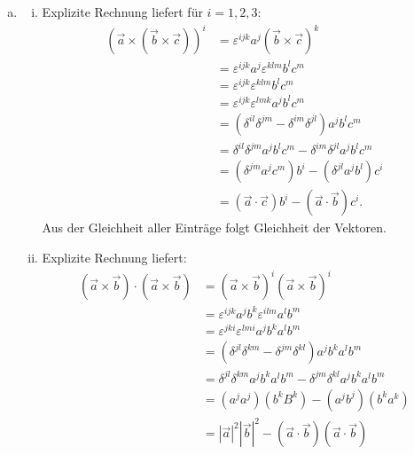 \documentclass{theozettel}
\renewcommand{\epsilon}{\varepsilon}
\begin{document}
\begin{enumerate}[(a)]
	\item 	\begin{enumerate}[(i)]
				\item 	Explizite Rechnung liefert für $i =  1,2,3$:
						\begin{align*}
							(\vec{a} \times (\vec{b} \times \vec{c}))^{i} &= \epsilon^{ijk}a^{j} (\vec{b} \times \vec{c})^{k} \\
							&= \epsilon^{ijk}a^{j}\epsilon^{klm} b^{l}c^{m} \\
							&= \epsilon^{ijk}\epsilon^{klm} b^{l}c^{m} \\
							&= \epsilon^{ijk}\epsilon^{lmk} a^{j}b^{l}c^{m} \\
							&= (\delta^{il}\delta^{jm} - \delta^{im}\delta^{jl}) a^{j}b^{l}c^{m} \\
							&= \delta^{il}\delta^{jm}a^{j}b^{l}c^{m} - \delta^{im}\delta^{jl}a^{j}b^{l}c^{m} \\
							&= (\delta^{jm}a^{j}c^{m})b^{i} - (\delta^{jl}a^{j}b^{l})c^{i} \\
							&= (\vec{a} \cdot \vec{c})b^{i} - (\vec{a} \cdot \vec{b})c^{i}.
						\end{align*}
						Aus der Gleichheit aller Einträge folgt Gleichheit der Vektoren.
						
				\item 	Explizite Rechnung liefert:
						\begin{align*}
							(\vec{a} \times \vec{b})\cdot (\vec{a} \times \vec{b}) &= (\vec{a} \times \vec{b})^{i}(\vec{a} \times \vec{b})^{i} \\
							&= \epsilon^{ijk}a^{j}b^{k} \epsilon^{ilm}a^{l}b^{m} \\
							&= \epsilon^{jki}\epsilon^{lmi} a^{j}b^{k} a^{l}b^{m} \\
							&= (\delta^{jl}\delta^{km} - \delta^{jm}\delta^{kl})a^{j}b^{k}a^{l}b^{m} \\
							&= \delta^{jl}\delta^{km}a^{j}b^{k}a^{l}b^{m} - \delta^{jm}\delta^{kl}a^{j}b^{k}a^{l}b^{m} \\
							&= (a^{j}a^{j})(b^{k}B^{k}) - (a^{j}b^{j})(b^{k}a^{k}) \\
							&= |\vec{a}|^{2}|\vec{b}|^{2} - (\vec{a} \cdot \vec{b})(\vec{a} \cdot \vec{b})
						\end{align*}	
			\end{enumerate}
\end{enumerate}
\end{document}
